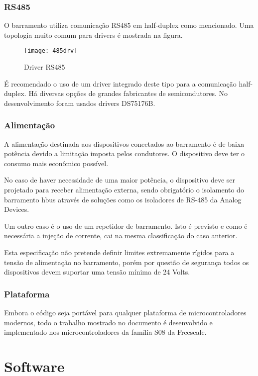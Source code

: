 \documentclass[11pt]{report}
\begin{document}
\section{RS485}

O barramento utiliza comunicação RS485 em half-duplex como mencionado. Uma topologia muito comum para drivers é mostrada na figura.

\begin{figure}[H]
\centering
\texttt{[image: 485drv]}
\caption{Driver RS485}
\end{figure}

É recomendado o uso de um driver integrado deste tipo para a comunicação half-duplex. Há diversas opções de grandes fabricantes de semicondutores. No desenvolvimento foram usados drivers DS75176B.

\section{Alimentação}

A alimentação destinada aos dispositivos conectados ao barramento é de baixa potência devido a limitação imposta pelos condutores. O dispositivo deve ter o consumo mais econômico possível.

No caso de haver necessidade de uma maior potência, o dispositivo deve ser projetado para receber alimentação externa, sendo obrigatório o isolamento do barramento hbus através de soluções como os isoladores de RS-485 da Analog Devices.

Um outro caso é o uso de um repetidor de barramento. Isto é previsto e como é necessária a injeção de corrente, cai na mesma classificação do caso anterior.

Esta especificação não pretende definir limites extremamente rígidos para a tensão de alimentação no barramento, porém por questão de segurança todos os dispositivos devem suportar uma tensão mínima de 24 Volts.

\section{Plataforma}

Embora o código seja portável para qualquer plataforma de microcontroladores modernos, todo o trabalho mostrado no documento é desenvolvido e implementado nos microcontroladores da família S08 da Freescale.

\part{Software}
\end{document}

